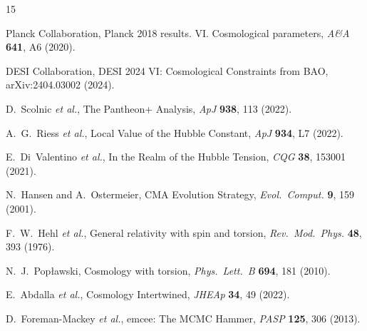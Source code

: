 \documentclass[twocolumn,showpacs,preprintnumbers,amsmath,amssymb,prl]{revtex4-2}
\begin{document}
\begin{thebibliography}{15}

Planck Collaboration, Planck 2018 results. VI. Cosmological parameters, \textit{A\&A} \textbf{641}, A6 (2020).

DESI Collaboration, DESI 2024 VI: Cosmological Constraints from BAO, arXiv:2404.03002 (2024).

D.~Scolnic \textit{et al.}, The Pantheon+ Analysis, \textit{ApJ} \textbf{938}, 113 (2022).

A.~G.~Riess \textit{et al.}, Local Value of the Hubble Constant, \textit{ApJ} \textbf{934}, L7 (2022).

E.~Di~Valentino \textit{et al.}, In the Realm of the Hubble Tension, \textit{CQG} \textbf{38}, 153001 (2021).

N.~Hansen and A.~Ostermeier, CMA Evolution Strategy, \textit{Evol.\ Comput.} \textbf{9}, 159 (2001).

F.~W.~Hehl \textit{et al.}, General relativity with spin and torsion, \textit{Rev.\ Mod.\ Phys.} \textbf{48}, 393 (1976).

N.~J.~Pop\l{}awski, Cosmology with torsion, \textit{Phys.\ Lett.\ B} \textbf{694}, 181 (2010).

E.~Abdalla \textit{et al.}, Cosmology Intertwined, \textit{JHEAp} \textbf{34}, 49 (2022).

D.~Foreman-Mackey \textit{et al.}, emcee: The MCMC Hammer, \textit{PASP} \textbf{125}, 306 (2013).

\end{thebibliography}
\end{document}
